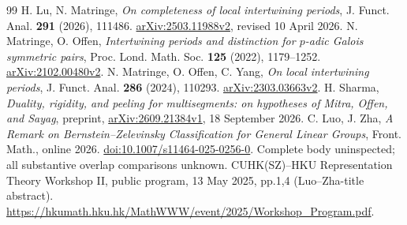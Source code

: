 \documentclass[11pt]{article}
\begin{document}
\begin{thebibliography}{99}
 H. Lu, N. Matringe, \emph{On completeness of local intertwining periods}, J. Funct. Anal. \textbf{291} (2026), 111486. \href{https://arxiv.org/abs/2503.11988v2}{arXiv:2503.11988v2}, revised 10 April 2026.
 N. Matringe, O. Offen, \emph{Intertwining periods and distinction for $p$-adic Galois symmetric pairs}, Proc. Lond. Math. Soc. \textbf{125} (2022), 1179--1252. \href{https://arxiv.org/abs/2102.00480v2}{arXiv:2102.00480v2}.
 N. Matringe, O. Offen, C. Yang, \emph{On local intertwining periods}, J. Funct. Anal. \textbf{286} (2024), 110293. \href{https://arxiv.org/abs/2303.03663v2}{arXiv:2303.03663v2}.
 H. Sharma, \emph{Duality, rigidity, and peeling for multisegments: on hypotheses of Mitra, Offen, and Sayag}, preprint, \href{https://arxiv.org/abs/2609.21384v1}{arXiv:2609.21384v1}, 18 September 2026.
 C. Luo, J. Zha, \emph{A Remark on Bernstein--Zelevinsky Classification for General Linear Groups}, Front. Math., online 2026. \href{https://doi.org/10.1007/s11464-025-0256-0}{doi:10.1007/s11464-025-0256-0}. Complete body uninspected; all substantive overlap comparisons unknown.
 CUHK(SZ)--HKU Representation Theory Workshop II, public program, 13 May 2025, pp.1,4 (Luo--Zha-title abstract). \url{https://hkumath.hku.hk/MathWWW/event/2025/Workshop_Program.pdf}.
\end{thebibliography}
\end{document}
